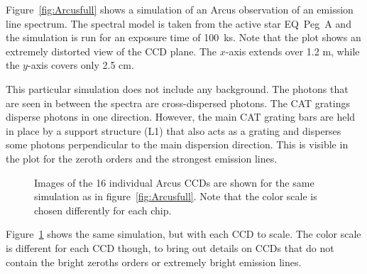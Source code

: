\documentclass[linenumbers]{aastex631}
\begin{document}
Figure~\ref{fig:Arcusfull} shows a simulation of an Arcus observation of an emission line spectrum. The spectral model is taken from the active star EQ~Peg~A \citep{2008A&A...491..859L} and the simulation is run for an exposure time of 100~ks. Note that the plot shows an extremely distorted view of the CCD plane. The $x$-axis extends over 1.2 m, while the $y$-axis covers only 2.5 cm.

This particular simulation does not include any background. The photons that are seen in between the spectra are cross-dispersed photons. The CAT gratings disperse photons in one direction. However, the main CAT grating bars are held in place by a support structure (L1) that also acts as a grating and disperses some photons perpendicular to the main dispersion direction. This is visible in the plot for the zeroth orders and the strongest emission lines.


\begin{figure}
    \caption{Images of the 16 individual Arcus CCDs are shown for the same simulation as in figure~\ref{fig:Arcusfull}. Note that the color scale is chosen differently for each chip.
        }
    \label{fig:Arcusall}
\end{figure}

Figure~\ref{fig:Arcusall} shows the same simulation, but with each CCD to scale. The color scale is different for each CCD though, to bring out details on CCDs that do not contain the bright zeroths orders or extremely bright emission lines.




\end{document}
